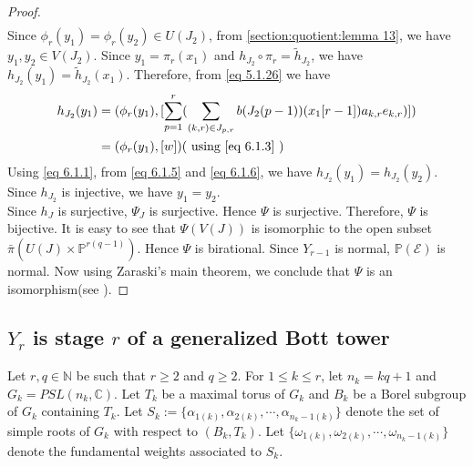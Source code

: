 \documentclass[12pt,reqno]{amsart}
\numberwithin{equation}{section}
\theoremstyle{definition}
\begin{document}
\begin{proof}
\begin{align}
		\end{align}
		Since $\phi_{r}(y_{1})=\phi_{r}(y_{2})\in U(J_{2})$, from \cref{section:quotient:lemma 13}, we have $y_{1},y_{2}\in V(J_{2})$. Since $y_{1}=\pi_{r}(x_{1})$ and $h_{J_{2}}\circ\pi_{r}=\tilde{h}_{J_{2}}$, we have  $h_{J_{2}}(y_{1})=\tilde{h}_{J_{2}}(x_{1})$. Therefore, from \cref{eq 5.1.26} we have
		\begin{align}
			h_{J_{2}}(y_{1})&=(\phi_{r}(y_{1}),[\sum_{p=1}^{r}(\sum_{\substack{(k,r)\in J_{p,r}}}b(J_{2}(p-1))(x_{1}[r-1])a_{k,r}e_{k,r})])\\
			&=(\phi_{r}(y_{1}),[w]) (\text{\ using \cref{eq 6.1.3}\ })\label{eq 6.1.6}
		\end{align}
		Using \cref{eq 6.1.1}, from \cref{eq 6.1.5} and \cref{eq 6.1.6}, we have
		$h_{J_{2}}(y_{1})=h_{J_{2}}(y_{2})$. Since $h_{J_{2}}$ is injective, we have $y_{1}=y_{2}$.\\
		Since $h_{J}$ is surjective, $\Psi_{J}$ is surjective. Hence $\Psi$ is surjective. Therefore, $\Psi$ is bijective. It is easy to see that $\Psi(V(J))$ is isomorphic to the open subset $\bar{\pi}(U(J)\times \mathbb{P}^{r(q-1)})$. Hence $\Psi$ is birational. Since $Y_{r-1}$ is normal, $\mathbb{P}(\mathcal{E})$ is normal. Now using Zaraski's main theorem, we conclude that $\Psi$ is an isomorphism(see \cite[Theorem 5.2.8]{springer}).
	\end{proof}
\subsection{$Y_{r}$ is stage $r$ of a generalized Bott tower} \label{section 6.1}Let $r,q\in\mathbb{N}$ be such that $r\ge2$ and $q\ge 2$.
	For $1\leq k\leq r$, let $n_{k}=kq+1$ and $G_{k}=PSL(n_{k},\mathbb{C})$. Let $T_{k}$ be a maximal torus of $G_{k}$ and  $B_{k}$ be a Borel subgroup of $G_{k}$ containing $T_{k}$. Let $S_{k}:=\{\alpha_{1(k)},\alpha_{2(k)},\cdots,\alpha_{n_{k}-1(k)}\}$ denote the set of simple roots of $G_{k}$ with respect to $(B_{k},T_{k})$. Let $\{\omega_{1(k)},\omega_{2(k)},\cdots,\omega_{n_{k}-1(k)}\}$ denote the fundamental weights associated to $S_{k}$. 
	
\end{document}
